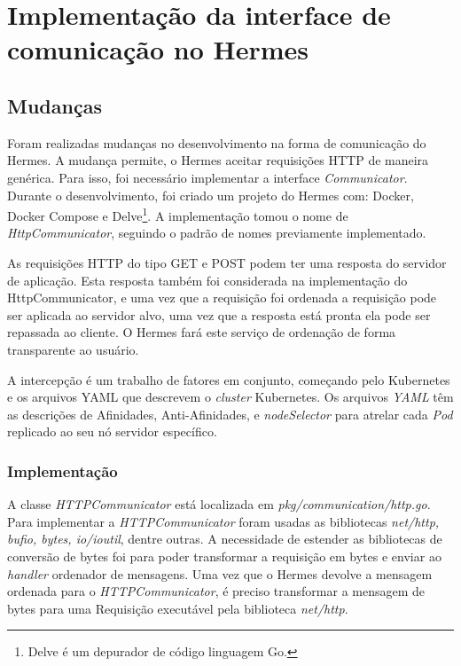 \chapter{Implementação da interface de comunicação no Hermes}
\label{cap:http}

\section{Mudanças}

Foram realizadas mudanças no desenvolvimento na forma de comunicação do Hermes. A mudança permite, o Hermes aceitar requisições HTTP de maneira genérica. Para isso, foi necessário implementar a interface \textit{Communicator}. Durante o desenvolvimento, foi criado um projeto do Hermes com: Docker, Docker Compose e Delve\footnote{Delve é um depurador de código linguagem Go.}. A implementação tomou o nome de \textit{HttpCommunicator}, seguindo o padrão de nomes previamente implementado.

As requisições HTTP do tipo GET e POST podem ter uma resposta do servidor de aplicação. Esta resposta também foi considerada na implementação do HttpCommunicator, e uma vez que a requisição foi ordenada a requisição pode ser aplicada ao servidor alvo, uma vez que a resposta está pronta ela pode ser repassada ao cliente. O Hermes fará este serviço de ordenação de forma transparente ao usuário.

A intercepção é um trabalho de fatores em conjunto, começando pelo Kubernetes e os arquivos YAML que descrevem o \textit{cluster} Kubernetes. Os arquivos \textit{YAML} têm as descrições de Afinidades, Anti-Afinidades, e \textit{nodeSelector} para atrelar cada \textit{Pod} replicado ao seu nó servidor específico.

\subsection{Implementação}

A classe \textit{HTTPCommunicator} está localizada em \textit{pkg/communication/http.go}. Para implementar a \textit{HTTPCommunicator} foram usadas as bibliotecas \textit{net/http, bufio, bytes, io/ioutil}, dentre outras. A necessidade de estender as bibliotecas de conversão de bytes foi para poder transformar a requisição em bytes e enviar ao \textit{handler} ordenador de mensagens. Uma vez que o Hermes devolve a mensagem ordenada para o \textit{HTTPCommunicator}, é preciso transformar a mensagem de bytes para uma Requisição executável pela biblioteca \textit{net/http}.

